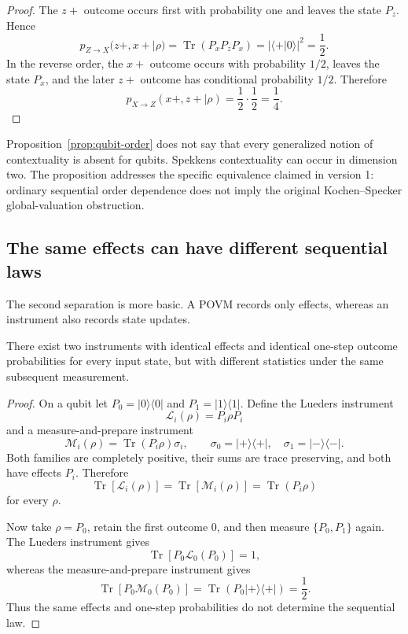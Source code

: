 \documentclass[11pt]{article}
\newcommand{\Tr}{\operatorname{Tr}}
\newcommand{\cL}{\mathcal{L}}
\newcommand{\cM}{\mathcal{M}}
\begin{document}
\begin{proof}
The \(z+\) outcome occurs first with probability one and leaves the state
\(P_z\). Hence
\[
p_{Z\rightarrow X}(z+,x+|\rho)
=\Tr(P_xP_zP_x)=|\langle+|0\rangle|^2=\frac12.
\]
In the reverse order, the \(x+\) outcome occurs with probability \(1/2\),
leaves the state \(P_x\), and the later \(z+\) outcome has conditional
probability \(1/2\). Therefore
\[
p_{X\rightarrow Z}(x+,z+|\rho)=\frac12\cdot\frac12=\frac14.
\]
\end{proof}

\begin{remark}
Proposition~\ref{prop:qubit-order} does not say that every generalized notion
of contextuality is absent for qubits. Spekkens contextuality can occur in
dimension two. The proposition addresses the specific equivalence claimed in
version 1: ordinary sequential order dependence does not imply the original
Kochen--Specker global-valuation obstruction.
\end{remark}

\subsection{The same effects can have different sequential laws}

The second separation is more basic. A POVM records only effects, whereas an
instrument also records state updates.

\begin{theorem}
\label{thm:instrument-underdetermination}
There exist two instruments with identical effects and identical one-step
outcome probabilities for every input state, but with different statistics
under the same subsequent measurement.
\end{theorem}

\begin{proof}
On a qubit let \(P_0=|0\rangle\langle0|\) and
\(P_1=|1\rangle\langle1|\). Define the Lueders instrument
\[
\cL_i(\rho)=P_i\rho P_i
\]
and a measure-and-prepare instrument
\[
\cM_i(\rho)=\Tr(P_i\rho)\sigma_i,
\qquad
\sigma_0=|+\rangle\langle+|,
\quad
\sigma_1=|-\rangle\langle-|.
\]
Both families are completely positive, their sums are trace preserving, and
both have effects \(P_i\). Therefore
\[
\Tr[\cL_i(\rho)]=\Tr[\cM_i(\rho)]=\Tr(P_i\rho)
\]
for every \(\rho\).

Now take \(\rho=P_0\), retain the first outcome \(0\), and then measure
\(\{P_0,P_1\}\) again. The Lueders instrument gives
\[
\Tr[P_0\cL_0(P_0)]=1,
\]
whereas the measure-and-prepare instrument gives
\[
\Tr[P_0\cM_0(P_0)]
=\Tr(P_0|+\rangle\langle+|)=\frac12.
\]
Thus the same effects and one-step probabilities do not determine the
sequential law.
\end{proof}
\end{document}
